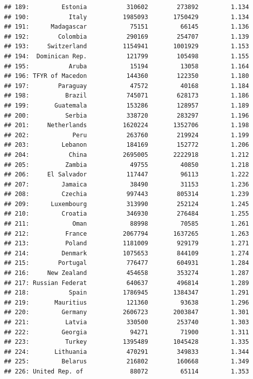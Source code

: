 \documentclass[10pt,]{article}
\begin{document}
\begin{verbatim}
## 189:         Estonia           310602        273892         1.134
## 190:           Italy          1985093       1750429         1.134
## 191:      Madagascar            75151         66145         1.136
## 192:        Colombia           290169        254707         1.139
## 193:     Switzerland          1154941       1001929         1.153
## 194:  Dominican Rep.           121799        105498         1.155
## 195:           Aruba            15194         13058         1.164
## 196: TFYR of Macedon           144360        122350         1.180
## 197:        Paraguay            47572         40168         1.184
## 198:          Brazil           745071        628173         1.186
## 199:       Guatemala           153286        128957         1.189
## 200:          Serbia           338720        283297         1.196
## 201:     Netherlands          1620224       1352706         1.198
## 202:            Peru           263760        219924         1.199
## 203:         Lebanon           184169        152772         1.206
## 204:           China          2695005       2222918         1.212
## 205:          Zambia            49755         40850         1.218
## 206:     El Salvador           117447         96113         1.222
## 207:         Jamaica            38490         31153         1.236
## 208:         Czechia           997443        805314         1.239
## 209:      Luxembourg           313990        252124         1.245
## 210:         Croatia           346930        276484         1.255
## 211:            Oman            88998         70585         1.261
## 212:          France          2067794       1637265         1.263
## 213:          Poland          1181009        929179         1.271
## 214:         Denmark          1075653        844109         1.274
## 215:        Portugal           776477        604931         1.284
## 216:     New Zealand           454658        353274         1.287
## 217: Russian Federat           640637        496814         1.289
## 218:           Spain          1786945       1384347         1.291
## 219:       Mauritius           121360         93638         1.296
## 220:         Germany          2606723       2003847         1.301
## 221:          Latvia           330500        253740         1.303
## 222:         Georgia            94271         71900         1.311
## 223:          Turkey          1395489       1045428         1.335
## 224:       Lithuania           470291        349833         1.344
## 225:         Belarus           216802        160668         1.349
## 226: United Rep. of             88072         65114         1.353

\end{verbatim}
\end{document}
